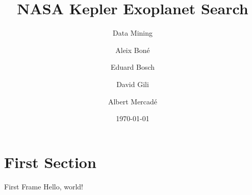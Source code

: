 \documentclass[aspectratio=169]{beamer}
\title{NASA Kepler Exoplanet Search}
\subtitle{Data Mining}
\date{\today}
\author{
Aleix Boné \and
Eduard Bosch \and
David Gili \and
Albert Mercadé
}
\institute{UPC}
\begin{document}
  \maketitle
  \section{First Section}
  \begin{frame}{First Frame}
    Hello, world!
  \end{frame}
\end{document}
